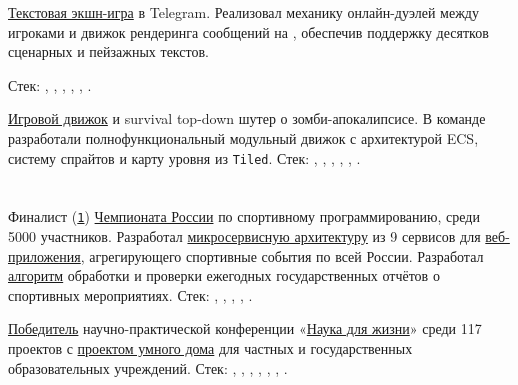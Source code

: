 \documentclass[margin,line]{resume}
\begin{document}
\begin{resume}
\begin{description}[leftmargin=0pt, itemindent=*, itemsep=8pt]
      \item[Starship:] \href{https://github.com/alchemmist/starship}{Текстовая экшн-игра} в Telegram. 
      Реализовал механику онлайн-дуэлей между игроками и движок рендеринга сообщений на , 
      обеспечив поддержку десятков сценарных и пейзажных текстов.

      Стек: , , , , , .


      \item[Corpse:] \href{https://github.com/alchemmist/corpse}{Игровой движок} и survival top-down шутер о зомби-апокалипсисе. 
      В команде разработали полнофункциональный модульный движок с архитектурой ECS, систему спрайтов и карту уровня из \texttt{Tiled}.
      Стек: , , , , , .

  \end{description}

  \section{}
  Финалист
  (\href{https://alchemmist.github.io/CV/attachments/russian-chemp-final.pdf}{\texttt{1}})
  \href{https://events.fsp-russia.com/championship}{Чемпионата
  России} по спортивному программированию, среди 5000 участников. Разработал
  \href{https://alchemmist.github.io/CV/attachments/architect.pdf}{микросервисную
  архитектуру} из 9 сервисов для
  \href{https://github.com/alchemmist/sportprog}{веб-приложения},
  агрегирующего спортивные события по
  всей России. Разработал
  \href{https://github.com/alchemmist/sport-afisha/blob/main/event_parsing_service/parse_pdf.py}{алгоритм}
  обработки и проверки ежегодных
  государственных
  отчётов о спортивных мероприятиях. Стек:
  , ,
  ,
  ,
  .

  \href{https://alchemmist.github.io/CV/attachments/scince-for-life-win.pdf}{Победитель}
  научно-практической конференции
  «\href{https://conf.profil.mos.ru/academ}{Наука для
  жизни}» среди 117 проектов с
  \href{https://github.com/smart-cab/}{проектом умного
  дома} для частных и государственных
  образовательных учреждений. Стек: ,
  , , ,
  , , .


\end{resume}
\end{document}
